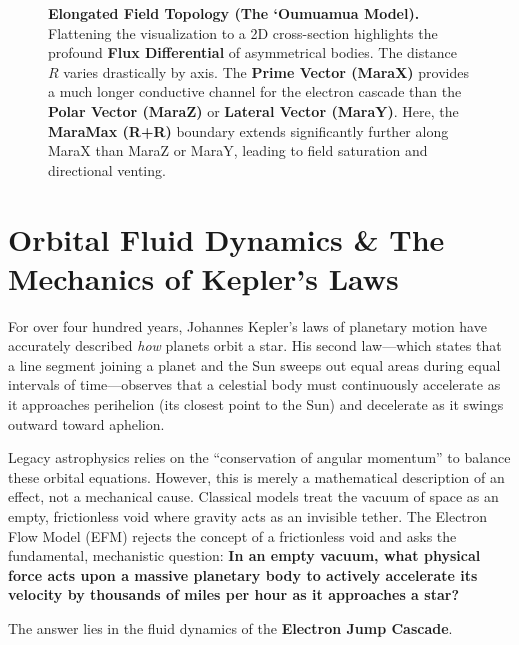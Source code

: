 \documentclass[11pt, a4paper]{article}
\begin{document}
\begin{figure}[!ht]
{\begin{tikzpicture}[scale=1.25, >=Stealth]
    \end{tikzpicture}
  }
  \caption{\textbf{Elongated Field Topology (The `Oumuamua Model).} Flattening the visualization to a 2D cross-section highlights the profound \textbf{Flux Differential} of asymmetrical bodies. The distance $R$ varies drastically by axis. The \textbf{Prime Vector (MaraX)} provides a much longer conductive channel for the electron cascade than the \textbf{Polar Vector (MaraZ)} or \textbf{Lateral Vector (MaraY)}. Here, the \textbf{MaraMax (R+R)} boundary extends significantly further along MaraX than MaraZ or MaraY, leading to field saturation and directional venting.}
  \label{fig:elongated_2d}
\end{figure}

\clearpage
\section{Orbital Fluid Dynamics \& The Mechanics of Kepler's Laws}

For over four hundred years, Johannes Kepler's laws of planetary motion have accurately described \textit{how} planets orbit a star. His second law—which states that a line segment joining a planet and the Sun sweeps out equal areas during equal intervals of time—observes that a celestial body must continuously accelerate as it approaches perihelion (its closest point to the Sun) and decelerate as it swings outward toward aphelion. 

Legacy astrophysics relies on the ``conservation of angular momentum'' to balance these orbital equations. However, this is merely a mathematical description of an effect, not a mechanical cause. Classical models treat the vacuum of space as an empty, frictionless void where gravity acts as an invisible tether. The Electron Flow Model (EFM) rejects the concept of a frictionless void and asks the fundamental, mechanistic question: \textbf{In an empty vacuum, what physical force acts upon a massive planetary body to actively accelerate its velocity by thousands of miles per hour as it approaches a star?}

The answer lies in the fluid dynamics of the \textbf{Electron Jump Cascade}. 

\end{document}
